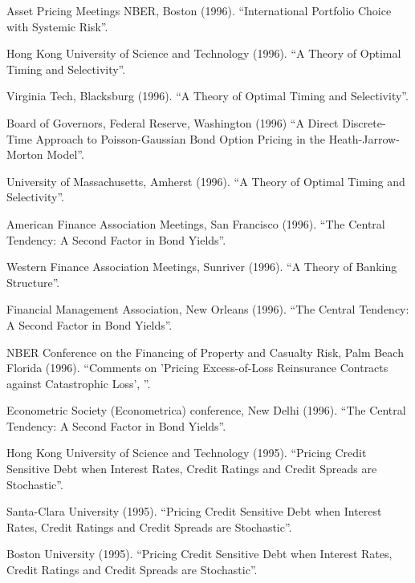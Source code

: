 \documentclass{article}
\begin{document}
\begin{etaremune}
{\item Asset Pricing Meetings NBER, Boston (1996). 
``International Portfolio Choice with Systemic Risk''.
 
\item Hong Kong University of Science and Technology (1996).
``A Theory of Optimal Timing and Selectivity''.  

\item Virginia Tech, Blacksburg (1996).
``A Theory of Optimal Timing and Selectivity''.  

\item Board of Governors, Federal Reserve, Washington (1996)
``A Direct Discrete-Time Approach to
Poisson-Gaussian Bond Option Pricing in the Heath-Jarrow-Morton 
Model''. 

\item University of Massachusetts, Amherst (1996).
``A Theory of Optimal Timing and Selectivity''.  

\item American Finance Association Meetings, San Francisco (1996).
``The Central Tendency: A Second Factor in Bond Yields''.

\item Western Finance Association Meetings, Sunriver (1996). 
``A Theory of Banking Structure''. 

\item Financial Management Association, New Orleans (1996).
``The Central Tendency: A Second Factor in Bond Yields''.

\item NBER Conference on the Financing of Property and Casualty Risk,
Palm Beach Florida (1996). 
``Comments on 'Pricing Excess-of-Loss Reinsurance Contracts against
Catastrophic Loss', ''. 

\item Econometric Society (Econometrica) conference, New
Delhi (1996). 
``The Central Tendency: A Second Factor in Bond Yields''.

\item Hong Kong University of Science and Technology (1995).
``Pricing Credit Sensitive Debt when Interest Rates, Credit Ratings
and Credit Spreads are Stochastic''.  

\item Santa-Clara University (1995).
``Pricing Credit Sensitive Debt when Interest Rates, Credit Ratings
and Credit Spreads are Stochastic''.  

\item Boston University (1995).
``Pricing Credit Sensitive Debt when Interest Rates, Credit Ratings
and Credit Spreads are Stochastic''.  

}
\end{etaremune}
\end{document}
